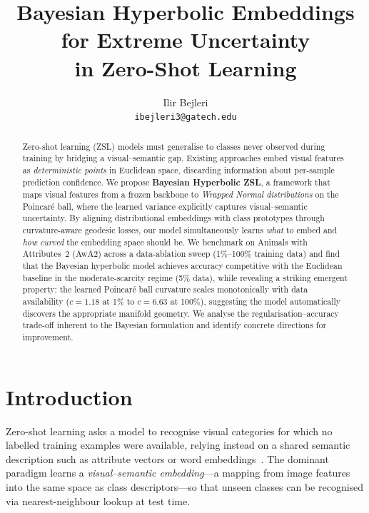 \documentclass{article}
\title{Bayesian Hyperbolic Embeddings for Extreme Uncertainty\\in Zero-Shot Learning}
\author{
  Ilir Bejleri \\
  \texttt{ibejleri3@gatech.edu}
}
\begin{document}
\maketitle

\begin{abstract}
Zero-shot learning (ZSL) models must generalise to classes never observed during training by bridging a visual--semantic gap.
Existing approaches embed visual features as \emph{deterministic points} in Euclidean space, discarding information about per-sample prediction confidence.
We propose \textbf{Bayesian Hyperbolic ZSL}, a framework that maps visual features from a frozen backbone to \emph{Wrapped Normal distributions} on the Poincar\'{e} ball, where the learned variance explicitly captures visual--semantic uncertainty.
By aligning distributional embeddings with class prototypes through curvature-aware geodesic losses, our model simultaneously learns \emph{what} to embed and \emph{how curved} the embedding space should be.
We benchmark on Animals with Attributes~2 (AwA2) across a data-ablation sweep (1\%--100\% training data) and find that the Bayesian hyperbolic model achieves accuracy competitive with the Euclidean baseline in the moderate-scarcity regime (5\% data), while revealing a striking emergent property: the learned Poincar\'{e} ball curvature scales monotonically with data availability ($c = 1.18$ at 1\% to $c = 6.63$ at 100\%), suggesting the model automatically discovers the appropriate manifold geometry.
We analyse the regularisation--accuracy trade-off inherent to the Bayesian formulation and identify concrete directions for improvement.
\end{abstract}

\section{Introduction}\label{sec:intro}

Zero-shot learning asks a model to recognise visual categories for which no labelled training examples were available, relying instead on a shared semantic description such as attribute vectors or word embeddings~\cite{romera2015embarrassingly,xian2019zsl}.
The dominant paradigm learns a \emph{visual--semantic embedding}---a mapping from image features into the same space as class descriptors---so that unseen classes can be recognised via nearest-neighbour lookup at test time.
\end{document}
